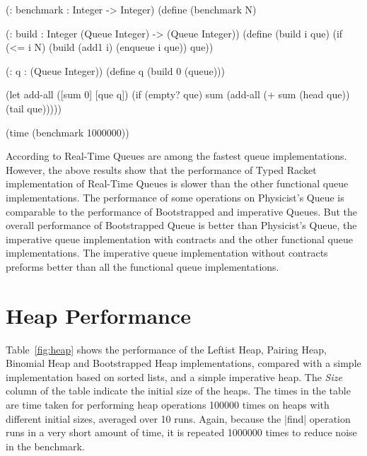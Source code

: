 \begin{benchmark}
 \begin{schemedisplay}
  (: benchmark : Integer -> Integer)
  (define (benchmark N)

    (: build : Integer (Queue Integer) -> (Queue Integer))
    (define (build i que)
      (if (<= i N)
          (build (add1 i) (enqueue i que))
          que))

    (: q : (Queue Integer))
    (define q (build 0 (queue)))

    (let add-all ([sum 0] [que q])
      (if (empty? que)
          sum
          (add-all (+ sum (head que)) (tail que)))))

  (time (benchmark 1000000))
 \end{schemedisplay}
 \label{bm:1}
\end{benchmark}

According to \citet{oka} Real-Time Queues are among the fastest queue
implementations. However, the above results show that the performance of
Typed Racket implementation of Real-Time Queues is slower than the other
functional queue implementations. The performance of some operations on
Physicist's Queue is comparable to the performance of Bootstrapped and
imperative Queues. But the overall performance of Bootstrapped Queue is
better than Physicist's Queue, the imperative queue implementation with
contracts and the other functional queue implementations. The imperative
queue implementation without contracts preforms better than all the
functional queue implementations.




\section{Heap Performance}
Table~\ref{fig:heap} shows the performance of the Leftist Heap, Pairing
Heap, Binomial Heap and Bootstrapped Heap implementations, compared with
a simple implementation based on sorted lists, and a simple imperative
heap. The \emph{Size} column of the table indicate the initial size of
the heaps. The times in the table are time taken for performing heap
operations 100000 times on heaps with different initial sizes, averaged
over 10 runs. Again, because the \scheme|find| operation runs in a very
short amount of time, it is repeated 1000000 times to reduce noise in
the benchmark.


